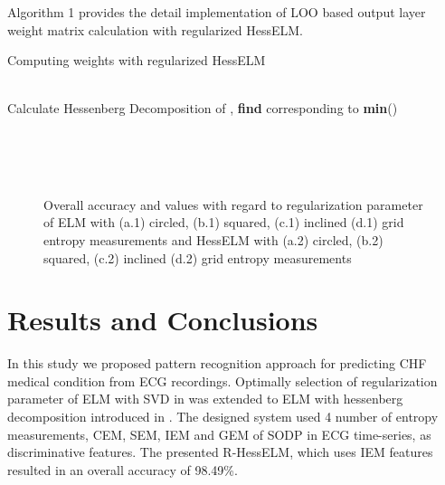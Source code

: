 \documentclass[twocolumn]{svjour3}
\begin{document}
Algorithm 1 provides the detail implementation of LOO based output layer weight matrix calculation with regularized HessELM.

\begin{algorithm}
\caption{Computing weights with regularized HessELM}\label{alg:euclid}
\begin{algorithmic}[1]\\
Calculate Hessenberg Decomposition of , 
\While{} 
\State 
\State 
\State 
\State 
\State 
{}
\State \textbf{find}  corresponding to \textbf{min}()
\State \\
\Return 
\EndProcedure
\end{algorithmic}
\end{algorithm}


\begin{figure*}\\
\\
\\
\caption{Overall accuracy and  values with regard to regularization parameter of ELM with (a.1)  circled, (b.1) squared, (c.1) inclined (d.1) grid entropy measurements and HessELM with (a.2)  circled, (b.2) squared, (c.2) inclined (d.2) grid entropy measurements}\label{figure5}\end{figure*}


\section{Results and Conclusions}
\label{resultsandconclusions}
In this study we proposed pattern recognition approach for predicting CHF medical condition from ECG recordings. Optimally selection of regularization parameter of ELM with SVD in \cite{ref18} was extended to ELM with hessenberg decomposition introduced in \cite{ref19}. The designed system used 4 number of entropy measurements, CEM, SEM, IEM and GEM of SODP in ECG time-series, as discriminative features. The presented R-HessELM, which uses IEM features resulted in an overall accuracy of 98.49\%.
\end{document}
